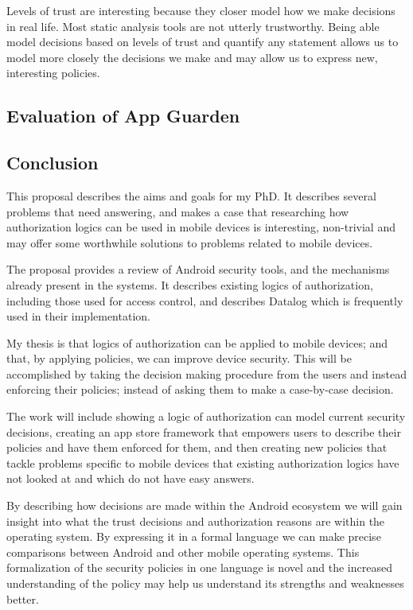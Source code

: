 \documentclass[a4paper]{article}
\begin{document}
Levels of trust are interesting because they closer model how we make decisions
in real life.  Most static analysis tools are not utterly trustworthy. Being
able model decisions based on levels of trust and quantify any statement allows
us to model more closely the decisions we make and may allow us to express new,
interesting policies.


\subsection{Evaluation of App Guarden}


\subsection{Conclusion}

This proposal describes the aims and goals for my PhD.  It describes several
problems that need answering, and makes a case that researching how
authorization logics can be used in mobile devices is interesting, non-trivial
and may offer some worthwhile solutions to problems related to mobile devices.

The proposal provides a review of Android security tools, and the mechanisms
already present in the systems.  It describes existing logics of authorization,
including those used for access control, and describes Datalog which is
frequently used in their implementation. 

My thesis is that logics of authorization can be applied to mobile devices; and
that, by applying policies, we can improve device security.  This will be
accomplished by taking the decision making procedure from the users and instead
enforcing their policies; instead of asking them to make a case-by-case
decision.

The work will include showing a logic of authorization can model current
security decisions, creating an app store framework that empowers users to
describe their policies and have them enforced for them, and then creating new
policies that tackle problems specific to mobile devices that existing
authorization logics have not looked at and which do not have easy answers.


By describing how decisions are made within the Android ecosystem we will gain
insight into what the trust decisions and authorization reasons are within the
operating system.  By expressing it in a formal language we can make precise
comparisons between Android and other mobile operating systems.  This
formalization of the security policies in one language is novel and the
increased understanding of the policy may help us understand its strengths and
weaknesses better.
\end{document}
